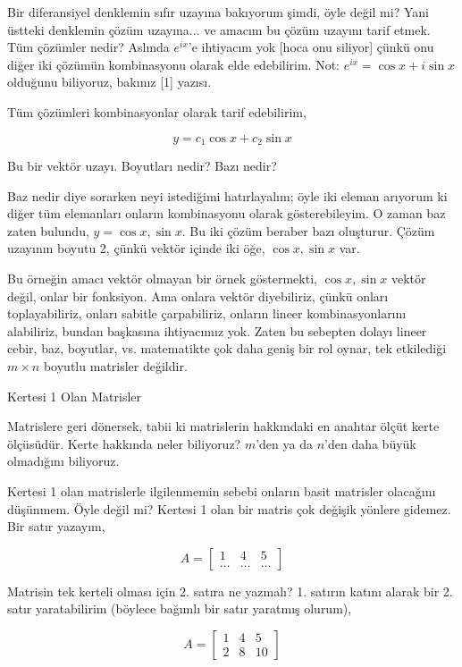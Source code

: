 \documentclass[12pt,fleqn]{article}\usepackage{../../common}
\begin{document}
Bir diferansiyel denklemin sıfır uzayına bakıyorum şimdi, öyle değil mi?
Yani üstteki denklemin çözüm uzayına... ve amacım bu çözüm uzayını tarif
etmek. Tüm çözümler nedir?  Aslında $e^{ix}$'e ihtiyacım yok [hoca onu
siliyor] çünkü onu diğer iki çözümün kombinasyonu olarak elde
edebilirim. Not: $e^{ix} = \cos x + i \sin x$ olduğunu biliyoruz, bakınız
[1] yazısı.

Tüm çözümleri kombinasyonlar olarak tarif edebilirim, 

$$ y = c_1 \cos x + c_2 \sin x $$

Bu bir vektör uzayı. Boyutları nedir? Bazı nedir?

Baz nedir diye sorarken neyi istediğimi hatırlayalım; öyle iki eleman
arıyorum ki diğer tüm elemanları onların kombinasyonu olarak
gösterebileyim. O zaman baz zaten bulundu, $y = \cos x, \sin x$. Bu iki
çözüm beraber bazı oluşturur. Çözüm uzayının boyutu 2, çünkü vektör içinde
iki öğe, $\cos x,\sin x$ var.

Bu örneğin amacı vektör olmayan bir örnek göstermekti, $\cos x,\sin x$
vektör değil, onlar bir fonksiyon. Ama onlara vektör diyebiliriz, çünkü
onları toplayabiliriz, onları sabitle çarpabiliriz, onların lineer
kombinasyonlarını alabiliriz, bundan başkasına ihtiyacımız yok. Zaten bu
sebepten dolayı lineer cebir, baz, boyutlar, vs. matematikte çok daha geniş
bir rol oynar, tek etkilediği $m \times n$ boyutlu matrisler değildir. 

Kertesi 1 Olan Matrisler 

Matrislere geri dönersek, tabii ki matrislerin hakkındaki en anahtar ölçüt
kerte ölçüsüdür. Kerte hakkında neler biliyoruz? $m$'den ya da $n$'den daha
büyük olmadığını biliyoruz. 

Kertesi 1 olan matrislerle ilgilenmemin sebebi onların basit matrisler
olacağını düşünmem. Öyle değil mi? Kertesi 1 olan bir matris çok değişik
yönlere gidemez. Bir satır yazayım,

$$ 
A = \left[\begin{array}{ccc}
1 & 4 & 5 \\ 
\ldots & \ldots & \ldots
\end{array}\right]
$$

Matrisin tek kerteli olması için 2. satıra ne yazmalı? 1. satırın katını
alarak bir 2. satır yaratabilirim (böylece bağımlı bir satır yaratmış
olurum),

$$ 
A = \left[\begin{array}{ccc}
1 & 4 & 5 \\
2 & 8 & 10
\end{array}\right]
 $$
 
\end{document}
